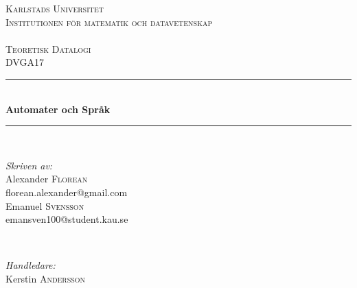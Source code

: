 \begin{titlepage}

\newcommand{\HRule}{\rule{\linewidth}{0.5mm}} %

\center %
 

 \textsc{\LARGE{Karlstads Universitet}\\ \small Institutionen för matematik och datavetenskap}\\
 \textsc{\Large \\Teoretisk Datalogi \\ \small DVGA17}\\ %



 \HRule \\[0.3cm]
 { \huge \bfseries Automater och Språk}\\[0.3cm] %
 \HRule \\[1.5cm]
  

  \begin{minipage}{0.4\textwidth}
  \begin{flushleft} \large
  \emph{Skriven av:}\\
  Alexander \textsc{Florean}\\
  florean.alexander@gmail.com\\ 
  Emanuel \textsc{Svensson}\\
  
  emansven100@student.kau.se
  \end{flushleft}
  \end{minipage}
  ~
  \begin{minipage}{0.4\textwidth}
  \begin{flushright} \large
  \emph{Handledare:}\\
  Kerstin \textsc{Andersson}
  

\end{flushright}
\end{minipage}
\end{titlepage}

